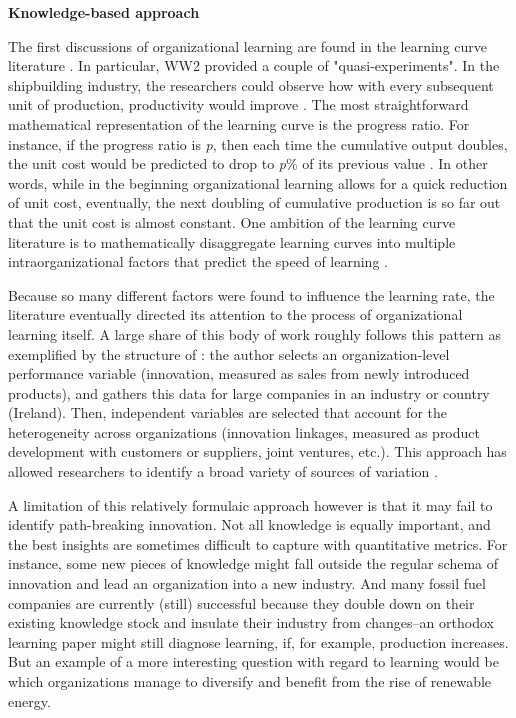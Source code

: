 \textbf{Knowledge-based approach}

The first discussions of organizational learning are found in the learning curve literature \citep{Wright1936}. In particular, WW2 provided a couple of "quasi-experiments". In the shipbuilding industry, the researchers could observe how with every subsequent unit of production, productivity would improve \citep{Searle1945}. The most straightforward mathematical representation of the learning curve is the progress ratio. For instance, if the progress ratio is \textit{p}, then each time the cumulative output doubles, the unit cost would be predicted to drop to \textit{p}\% of its previous value \citep[p. 15]{Argote2013-1}. In other words, while in the beginning organizational learning allows for a quick reduction of unit cost, eventually, the next doubling of cumulative production is so far out that the unit cost is almost constant. One ambition of the learning curve literature is to mathematically disaggregate learning curves into multiple intraorganizational factors that predict the speed of learning \citep[e.g.,][]{Arrow1962}.

Because so many different factors were found to influence the learning rate, the literature eventually directed its attention to the process of organizational learning itself. A large share of this body of work roughly follows this pattern as exemplified by the structure of \citet{Love2014}: the author selects an organization-level performance variable (innovation, measured as sales from newly introduced products), and gathers this data for large companies in an industry or country (Ireland). Then, independent variables are selected that account for the heterogeneity across organizations (innovation linkages, measured as product development with customers or suppliers, joint ventures, etc.). This approach has allowed researchers to identify a broad variety of sources of variation \citep[pp. 18ff]{Argote2013-1}.

A limitation of this relatively formulaic approach however is that it may fail to identify path-breaking innovation. Not all knowledge is equally important, and the best insights are sometimes difficult to capture with quantitative metrics. For instance, some new pieces of knowledge might fall outside the regular schema of innovation and lead an organization into a new industry. And many fossil fuel companies are currently (still) successful because they double down on their existing knowledge stock and insulate their industry from changes--an orthodox learning paper might still diagnose learning, if, for example, production increases. But an example of a more interesting question with regard to learning would be which organizations manage to diversify and benefit from the rise of renewable energy.

